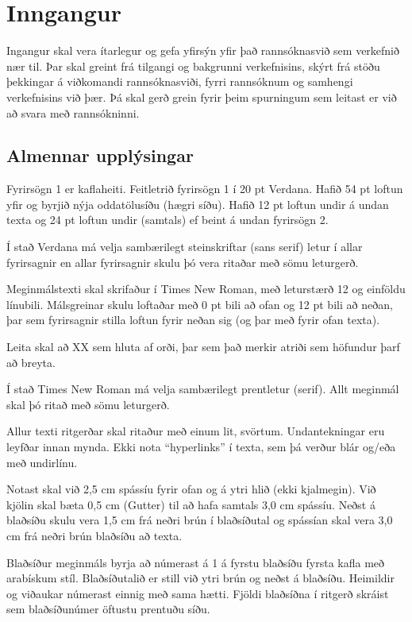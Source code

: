 \documentclass[a4paper,12pt,twoside,BCOR=10mm]{scrbook}
\begin{document}
\chapter{Inngangur}
\setcounter{page}{1}
Ingangur skal vera ítarlegur og gefa yfirsýn yfir það rannsóknasvið sem verkefnið nær til. Þar skal greint frá tilgangi og bakgrunni verkefnisins, skýrt frá stöðu þekkingar á viðkomandi rannsóknasviði, fyrri rannsóknum og samhengi verkefnisins við þær. Þá skal gerð grein fyrir þeim spurningum sem leitast er við að svara með rannsókninni.

\section{Almennar upplýsingar}
Fyrirsögn 1 er kaflaheiti. Feitletrið fyrirsögn 1 í 20 pt Verdana. Hafið 54 pt loftun yfir og byrjið nýja oddatölusíðu (hægri síðu). Hafið 12 pt loftun undir á undan texta og 24 pt loftun undir (samtals) ef beint á undan fyrirsögn 2.

Í stað Verdana má velja sambærilegt steinskriftar (sans serif) letur í allar fyrirsagnir en allar fyrirsagnir skulu þó vera ritaðar með sömu leturgerð.

Meginmálstexti skal skrifaður í Times New Roman, með leturstærð 12 og einföldu línubili. Málsgreinar skulu loftaðar með 0 pt bili að ofan og 12 pt bili að neðan, þar sem fyrirsagnir stilla loftun fyrir neðan sig (og þar með fyrir ofan texta).

Leita skal að XX sem hluta af orði, þar sem það merkir atriði sem höfundur þarf að breyta.

Í stað Times New Roman má velja sambærilegt prentletur (serif). Allt meginmál skal þó ritað með sömu leturgerð. 

Allur texti ritgerðar skal ritaður með einum lit, svörtum. Undantekningar eru leyfðar innan mynda. Ekki nota “hyperlinks” í texta, sem þá verður blár og/eða með undirlínu.

Notast skal við 2,5 cm spássíu fyrir ofan og á ytri hlið (ekki kjalmegin). Við kjölin skal bæta 0,5 cm (Gutter) til að hafa samtals 3,0 cm spássíu. Neðst á blaðsíðu skulu vera 1,5 cm frá neðri brún í blaðsíðutal og spássían skal vera 3,0 cm frá neðri brún blaðsíðu að texta.

Blaðsíður meginmáls byrja að númerast á 1 á fyrstu blaðsíðu fyrsta kafla með arabískum stíl. Blaðsíðutalið er still við ytri brún og neðst á blaðsíðu. Heimildir og viðaukar númerast einnig með sama hætti. Fjöldi blaðsíðna í ritgerð skráist sem blaðsíðunúmer öftustu prentuðu síðu.
\end{document}
